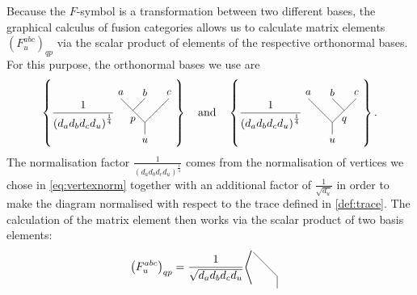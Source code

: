 \begin{rem}
	\label{rem:Felements}
	Because the $F$-symbol is a transformation between two different bases, the graphical calculus of fusion categories allows us to calculate matrix elements $\left(F_u^{abc}\right)_{qp}$ via the scalar product of elements of the respective orthonormal bases. For this purpose, the orthonormal bases we use are 
		\begin{equation}
			\left\{\frac{1}{\left(d_ad_bd_cd_u\right)^{\frac{1}{4}}}\begin{tikzpicture}[baseline=(current bounding box.center),yscale=0.75,xscale=0.75]
				\draw (0,0.5) -- (0,1);
				\draw (0,1) -- (-0.5,1.5);
				\draw (-0.5,1.5) -- (-1,2);
				\draw (-0.5,1.5) -- (0,2);
				\draw (0,1) -- (0.5,1.5);
				\draw (0.5,1.5) -- (1,2);
				\node at (0,0.25) {\small $u$};
				\node at (-1,2.25) {\small $a$};
				\node at (0,2.25) {\small $b$};
				\node at (1,2.25) {\small $c$};
				\node at (-0.5,1.1) {\small $p$};
			\end{tikzpicture}\right\}\hspace{10pt}\mathrm{and}\hspace{10pt}
			\left\{\frac{1}{\left(d_ad_bd_cd_u\right)^{\frac{1}{4}}}\begin{tikzpicture}[baseline=(current bounding box.center),yscale=0.75,xscale=0.75]
				\draw (0,0.5) -- (0,1);
				\draw (0,1) -- (-0.5,1.5);
				\draw (-0.5,1.5) -- (-1,2);
				\draw (0.5,1.5) -- (0,2);
				\draw (0,1) -- (0.5,1.5);
				\draw (0.5,1.5) -- (1,2);
				\node at (0,0.25) {\small $u$};
				\node at (-1,2.25) {\small $a$};
				\node at (0,2.25) {\small $b$};
				\node at (1,2.25) {\small $c$};
				\node at (0.5,1.1) {\small $q$};
			\end{tikzpicture}\right\}.
		\end{equation}
	The normalisation factor $\frac{1}{\left(d_ad_bd_cd_u\right)^{\frac{1}{4}}}$ comes from the normalisation of vertices we chose in \cref{eq:vertexnorm} together with an additional factor of $\frac{1}{\sqrt{d_u}}$ in order to make the diagram normalised with respect to the trace defined in \cref{def:trace}. The calculation of the matrix element then works via the scalar product of two basis elements:	
		\begin{align}
			\left(F_u^{abc}\right)_{qp}&=\frac{1}{\sqrt{d_a d_b d_c d_u}}
			\Bigg\langle
			\begin{tikzpicture}[baseline=(current bounding box.center),yscale=0.75,xscale=0.75]
				\draw (0,0.5) -- (0,1);
				\draw (0,1) -- (-0.5,1.5);
				\draw (-0.5,1.5) -- (-1,2);

\end{tikzpicture}
\end{align}
\end{rem}
